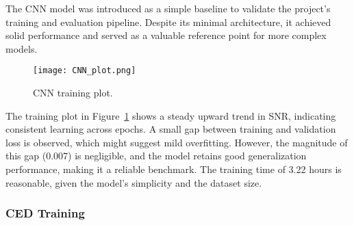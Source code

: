 The CNN model was introduced as a simple baseline to validate the project’s training and evaluation pipeline. Despite its minimal architecture, it achieved solid performance and served as a valuable reference point for more complex models.

\begin{figure}[H]
    \centering
    \texttt{[image: CNN\_plot.png]}
    \caption{\label{fig:cnn_training_plot} CNN training plot.}
\end{figure}

The training plot in Figure~\ref{fig:cnn_training_plot} shows a steady upward trend in SNR, indicating consistent learning across epochs. A small gap between training and validation loss is observed, which might suggest mild overfitting. However, the magnitude of this gap (0.007) is negligible, and the model retains good generalization performance, making it a reliable benchmark. The training time of 3.22 hours is reasonable, given the model's simplicity and the dataset size.

\subsubsection{CED Training}
\label{sec:ced_training}


